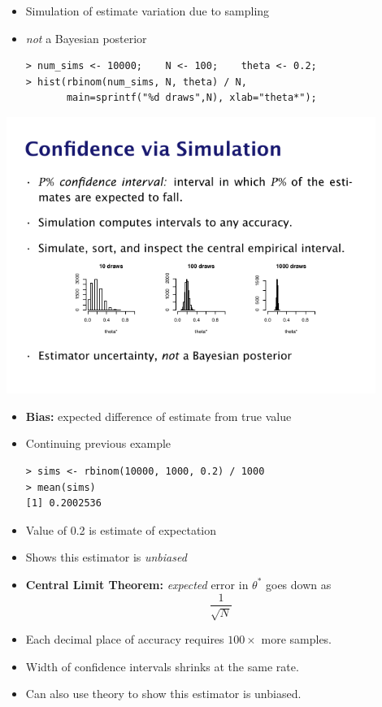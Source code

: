 \documentclass[10pt]{report}
\begin{document}
%
\begin{itemize}
\item Simulation of estimate variation due to sampling
\item \emph{not} a Bayesian posterior
\\[-8pt]
{\small
\begin{Verbatim}
> num_sims <- 10000;    N <- 100;    theta <- 0.2;
> hist(rbinom(num_sims, N, theta) / N,
       main=sprintf("%d draws",N), xlab="theta*");
\end{Verbatim}
}
\end{itemize}
\vspace*{-4pt}
\begin{center}
\includegraphics[width=0.9\textwidth]{img/hist-10-100-1000.pdf}
\end{center}

\begin{itemize}
\item {\bfseries Bias:} expected difference of estimate from true value
\item Continuing previous example
{\small
\begin{Verbatim}
> sims <- rbinom(10000, 1000, 0.2) / 1000
> mean(sims)
[1] 0.2002536
\end{Verbatim}
}
\item Value of 0.2 is estimate of expectation
\item Shows this estimator is \emph{unbiased}
\end{itemize}

\begin{itemize}
\item {\bfseries Central Limit Theorem:}  \emph{expected} error in $\theta^*$ goes down as
{\Large
\[
\frac{1}{\sqrt{N}}
\]
}
\item Each decimal place of accuracy requires $100 \times$ more samples.
\item Width of confidence intervals shrinks at the same rate.
\vfill
\item Can also use theory to show this estimator is unbiased.
\end{itemize}
\end{document}
